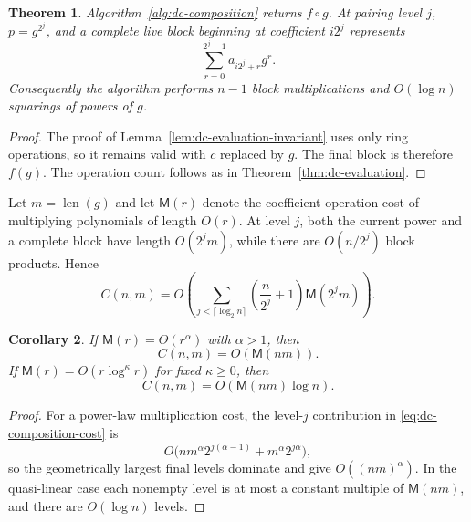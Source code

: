 \documentclass[11pt]{book}
\newtheorem{theorem}{Theorem}[section]
\newtheorem{corollary}[theorem]{Corollary}
\theoremstyle{definition}
\newcommand{\len}{\operatorname{len}}
\begin{document}
\begin{theorem}\label{thm:dc-composition}
Algorithm~\ref{alg:dc-composition} returns $f\circ g$.
At pairing level $j$, $p=g^{2^j}$, and a complete live block beginning at
coefficient $i2^j$ represents
\[
 \sum_{r=0}^{2^j-1}a_{i2^j+r}g^r.
\]
Consequently the algorithm performs $n-1$ block multiplications and
$O(\log n)$ squarings of powers of $g$.
\end{theorem}

\begin{proof}
The proof of Lemma~\ref{lem:dc-evaluation-invariant} uses only ring operations,
so it remains valid with $c$ replaced by $g$.  The final block is therefore
$f(g)$.  The operation count follows as in
Theorem~\ref{thm:dc-evaluation}.
\end{proof}

Let $m=\len(g)$ and let $\mathsf M(r)$ denote the coefficient-operation cost
of multiplying polynomials of length $O(r)$.  At level $j$, both the current
power and a complete block have length $O(2^jm)$, while there are
$O(n/2^j)$ block products.  Hence
\begin{equation}\label{eq:dc-composition-cost}
 C(n,m)=O\left(
   \sum_{j<\lceil\log_2 n\rceil}
   \left(\frac{n}{2^j}+1\right)\mathsf M(2^jm)
 \right).
\end{equation}

\begin{corollary}\label{cor:dc-composition-cost}
If $\mathsf M(r)=\Theta(r^\alpha)$ with $\alpha>1$, then
\[
 C(n,m)=O(\mathsf M(nm)).
\]
If $\mathsf M(r)=O(r\log^\kappa r)$ for fixed $\kappa\ge0$, then
\[
 C(n,m)=O(\mathsf M(nm)\log n).
\]
\end{corollary}

\begin{proof}
For a power-law multiplication cost, the level-$j$ contribution in
\eqref{eq:dc-composition-cost} is
\[
 O\bigl(nm^\alpha2^{j(\alpha-1)}+m^\alpha2^{j\alpha}\bigr),
\]
so the geometrically largest final levels dominate and give
$O((nm)^\alpha)$.  In the quasi-linear case each nonempty level is at most a
constant multiple of $\mathsf M(nm)$, and there are $O(\log n)$ levels.
\end{proof}
\end{document}
